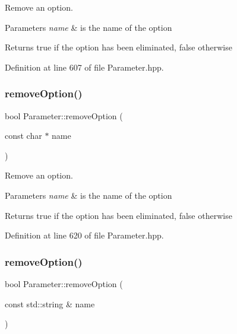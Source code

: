 Remove an option. 


\begin{DoxyParams}{Parameters}
{\em name} & is the name of the option \\
\hline
\end{DoxyParams}
\begin{DoxyReturn}{Returns}
true if the option has been eliminated, false otherwise 
\end{DoxyReturn}


Definition at line 607 of file Parameter.\+hpp.

\mbox{\label{classParameter_ad97b626096bf56ca17d6aedb22d8c677}} 
\subsubsection{\texorpdfstring{remove\+Option()}{removeOption()}\hspace{0.1cm}{\footnotesize\ttfamily [2/3]}}
{\footnotesize\ttfamily bool Parameter\+::remove\+Option (\begin{DoxyParamCaption}\item[{const char $\ast$}]{name }\end{DoxyParamCaption})\hspace{0.3cm}{\ttfamily [inline]}}



Remove an option. 


\begin{DoxyParams}{Parameters}
{\em name} & is the name of the option \\
\hline
\end{DoxyParams}
\begin{DoxyReturn}{Returns}
true if the option has been eliminated, false otherwise 
\end{DoxyReturn}


Definition at line 620 of file Parameter.\+hpp.

\mbox{\label{classParameter_ae36e82ccf60c118684f0d87d67b6695f}} 
\subsubsection{\texorpdfstring{remove\+Option()}{removeOption()}\hspace{0.1cm}{\footnotesize\ttfamily [3/3]}}
{\footnotesize\ttfamily bool Parameter\+::remove\+Option (\begin{DoxyParamCaption}\item[{const std\+::string \&}]{name }\end{DoxyParamCaption})\hspace{0.3cm}{\ttfamily [inline]}}



